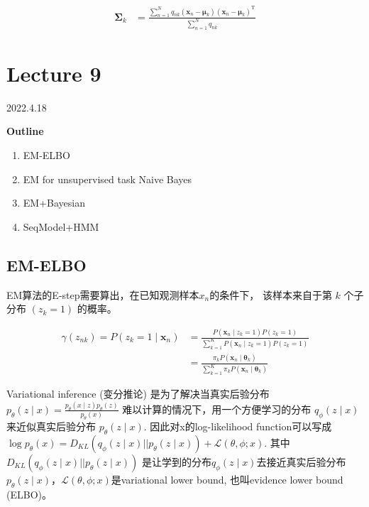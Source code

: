\documentclass[UTF8]{ctexart}
\numberwithin{equation}{section}
\begin{document}
$$
\begin{aligned}
\boldsymbol{\Sigma}_{k} &=\frac{\sum_{n=1}^{N} q_{n k}\left(\boldsymbol{x}_{n}-\boldsymbol{\mu}_{k}\right)\left(\boldsymbol{x}_{n}-\boldsymbol{\mu}_{k}\right)^{\mathrm{T}}}{\sum_{n=1}^{N} q_{n k}}
\end{aligned}
$$


\newpage
\section{Lecture 9}
2022.4.18

\textbf{Outline}
\begin{enumerate}
    \item EM-ELBO
    \item EM for unsupervised task Naive Bayes
    \item EM+Bayesian
    \item SeqModel+HMM
\end{enumerate}

\subsection{EM-ELBO}
EM算法的E-step需要算出，在已知观测样本$x_n$的条件下，
该样本来自于第 $k$ 个子分布 $\left(z_{k}=1\right)$ 的概率。

$$
\begin{aligned}
\gamma\left(z_{n k}\right)=P\left(z_{k}=1 \mid \boldsymbol{x}_{n}\right) &=\frac{P\left(\boldsymbol{x}_{n} \mid z_{k}=1\right) P\left(z_{k}=1\right)}{\sum_{k=1}^{K} P\left(\boldsymbol{x}_{n} \mid z_{k}=1\right) P\left(z_{k}=1\right)} \\
&=\frac{\pi_{k} P\left(\boldsymbol{x}_{n} \mid \boldsymbol{\theta}_{k}\right)}{\sum_{k=1}^{K} \pi_{k} P\left(\boldsymbol{x}_{n} \mid \boldsymbol{\theta}_{k}\right)}
\end{aligned}
$$

Variational inference (变分推论) 是为了解决当真实后验分布 
$p_{\theta}(z \mid x)=\frac{p_{\theta}(x \mid z) p_{\theta}(z)}{p_{\theta}(x)}$ 难以计算的情况下，用一个方便学习的分布 $q_{\phi}(z \mid x)$来近似真实后验分布 $p_{\theta}(z \mid x)$.
因此对x的log-likelihood function可以写成 
$\log p_{\theta}(x)=D_{K L}\left(q_{\phi}(z \mid x)|| p_{\theta}(z \mid x)\right)+\mathcal{L}(\theta, \phi ; x)$. 
其中$D_{K L}\left(q_{\phi}(z \mid x)|| p_{\theta}(z \mid x)\right)$ 
是让学到的分布$q_{\phi}(z \mid x)$去接近真实后验分布$p_{\theta}(z \mid x)$，$\mathcal{L}(\theta, \phi ; x)$是variational lower bound, 也叫evidence lower bound (ELBO)。
\end{document}
